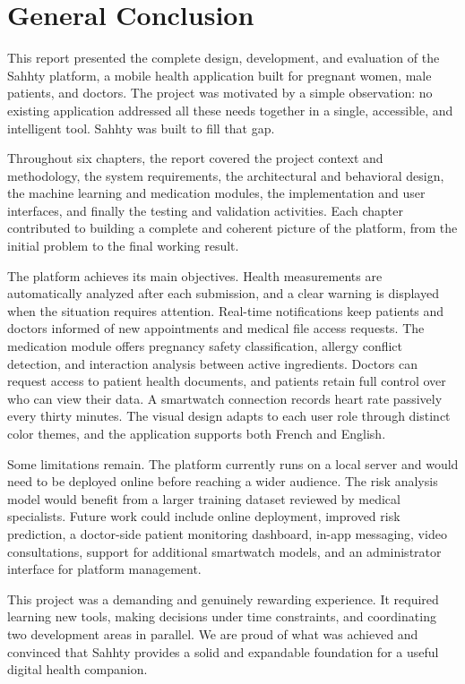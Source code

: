 
\chapter*{General Conclusion}

This report presented the complete design, development, and evaluation of the Sahhty platform, a mobile health application built for pregnant women, male patients, and doctors. The project was motivated by a simple observation: no existing application addressed all these needs together in a single, accessible, and intelligent tool. Sahhty was built to fill that gap.

Throughout six chapters, the report covered the project context and methodology, the system requirements, the architectural and behavioral design, the machine learning and medication modules, the implementation and user interfaces, and finally the testing and validation activities. Each chapter contributed to building a complete and coherent picture of the platform, from the initial problem to the final working result.

The platform achieves its main objectives. Health measurements are automatically analyzed after each submission, and a clear warning is displayed when the situation requires attention. Real-time notifications keep patients and doctors informed of new appointments and medical file access requests. The medication module offers pregnancy safety classification, allergy conflict detection, and interaction analysis between active ingredients. Doctors can request access to patient health documents, and patients retain full control over who can view their data. A smartwatch connection records heart rate passively every thirty minutes. The visual design adapts to each user role through distinct color themes, and the application supports both French and English.

Some limitations remain. The platform currently runs on a local server and would need to be deployed online before reaching a wider audience. The risk analysis model would benefit from a larger training dataset reviewed by medical specialists. Future work could include online deployment, improved risk prediction, a doctor-side patient monitoring dashboard, in-app messaging, video consultations, support for additional smartwatch models, and an administrator interface for platform management.

This project was a demanding and genuinely rewarding experience. It required learning new tools, making decisions under time constraints, and coordinating two development areas in parallel. We are proud of what was achieved and convinced that Sahhty provides a solid and expandable foundation for a useful digital health companion.
